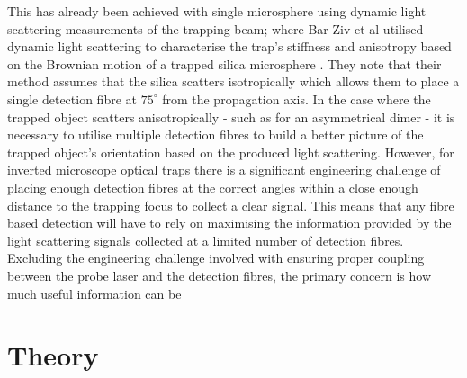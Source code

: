 \documentclass[11pt]{article}
\begin{document}
This has already been achieved with single microsphere using dynamic light scattering measurements of the trapping beam; where Bar-Ziv et al utilised dynamic light scattering to characterise the trap's stiffness and anisotropy based on the Brownian motion of a trapped silica microsphere \cite{1}. They note that their method assumes that the silica scatters isotropically which allows them to place a single detection fibre at $75^\circ$ from the propagation axis. In the case where the trapped object scatters anisotropically - such as for an asymmetrical dimer - it is necessary to utilise multiple detection fibres to build a better picture of the trapped object's orientation based on the produced light scattering. However, for inverted microscope optical traps there is a significant engineering challenge of placing enough detection fibres at the correct angles within a close enough distance to the trapping focus to collect a clear signal. This means that any fibre based detection will have to rely on maximising the information provided by the light scattering signals collected at a limited number of detection fibres. Excluding the engineering challenge involved with ensuring proper coupling between the probe laser and the detection fibres, the primary concern is how much useful information can be

\section*{Theory}
\end{document}
